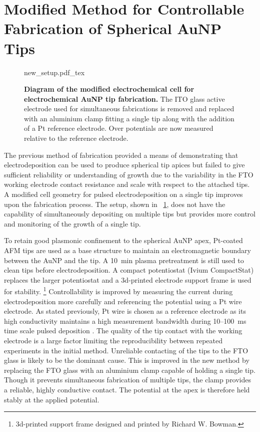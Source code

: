 \documentclass{article}
\begin{document}
\section{Modified Method for Controllable Fabrication of Spherical AuNP Tips}

\begin{figure}[bt]
\centering
\fontsize{10pt}{1em}\selectfont
{new_setup.pdf_tex}
\caption[Diagram of the modified method for electrochemical AuNP tip fabrication.]{\textbf{Diagram of the modified electrochemical cell for electrochemical AuNP tip fabrication.} The ITO glass active electrode used for simultaneous fabrications is removed and replaced with an aluminium clamp fitting a single tip along with the addition of a Pt reference electrode. Over potentials are now measured relative to the reference electrode.}
\label{fig:new_method}
\end{figure}

The previous method of fabrication provided a means of demonstrating that electrodeposition can be used to produce spherical tip apices but failed to give sufficient reliability or understanding of growth due to the variability in the FTO working electrode contact resistance and scale with respect to the attached tips. A modified cell geometry for pulsed electrodeposition on a single tip improves upon the fabrication process. The setup, shown in \figurename~\ref{fig:new_method}, does not have the capability of simultaneously depositing on multiple tips but provides more control and monitoring of the growth of a single tip.

To retain good plasmonic confinement to the spherical AuNP apex, Pt-coated AFM tips are used as a base structure to maintain an electromagnetic boundary between the AuNP and the tip.
A \SI{10}{\minute}  plasma pretreatment is still used to clean tips before electrodeposition.
A compact potentiostat (Ivium CompactStat) replaces the larger potentiostat and a 3d-printed electrode support frame is used for stability.%
\footnote{3d-printed support frame designed and printed by Richard W. Bowman.}
Controllability is improved by measuring the current during electrodeposition more carefully and referencing the potential using a Pt wire electrode. As stated previously, Pt wire is chosen as a reference electrode as its high conductivity maintains a high measurement bandwidth during 10--\SI{100}{ms} time scale pulsed deposition \cite{sawyer1995electrochemistry}.
The quality of the tip contact with the working electrode is a large factor limiting the reproducibility between repeated experiments in the initial method. Unreliable contacting of the tips to the FTO glass is likely to be the dominant cause. This is improved in the new method by replacing the FTO glass with an aluminium clamp capable of holding a single tip. Though it prevents simultaneous fabrication of multiple tips, the clamp provides a reliable, highly conductive contact. The potential at the apex is therefore held stably at the applied potential.
\end{document}
